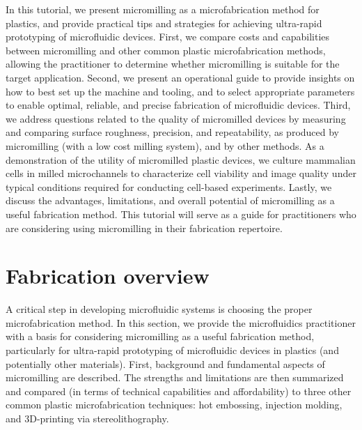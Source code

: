 In this tutorial, we present micromilling as a microfabrication method for plastics, and provide practical tips and strategies for achieving ultra-rapid prototyping of microfluidic devices. First, we compare costs and capabilities between micromilling and other common plastic microfabrication methods, allowing the practitioner to determine whether micromilling is suitable for the target application. Second, we present an operational guide to provide insights on how to best set up the machine and tooling, and to select appropriate parameters to enable optimal, reliable, and precise fabrication of microfluidic devices. Third, we address questions related to the quality of micromilled devices by measuring and comparing surface roughness, precision, and repeatability, as produced by micromilling (with a low cost milling system), and by other methods. As a demonstration of the utility of micromilled plastic devices, we culture mammalian cells in milled microchannels to characterize cell viability and image quality under typical conditions required for conducting cell-based experiments. Lastly, we discuss the advantages, limitations, and overall potential of micromilling as a useful fabrication method. This tutorial will serve as a guide for practitioners who are considering using micromilling in their fabrication repertoire.


\section{Fabrication overview}
A critical step in developing microfluidic systems is choosing the proper microfabrication method. In this section, we provide the microfluidics practitioner with a basis for considering micromilling as a useful fabrication method, particularly for ultra-rapid prototyping of microfluidic devices in plastics (and potentially other materials). First, background and fundamental aspects of micromilling are described. The strengths and limitations are then summarized and compared (in terms of technical capabilities and affordability) to three other common plastic microfabrication techniques: hot embossing, injection molding, and 3D-printing via stereolithography.

